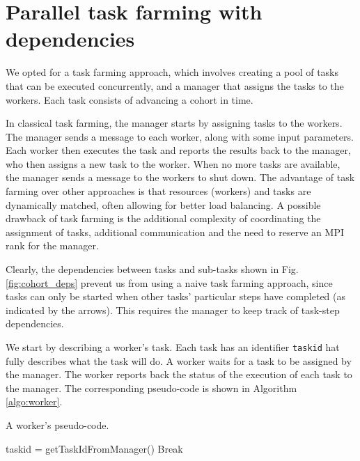 \documentclass[a4paper,oneside,12pt]{article}
\begin{document}
\section{Parallel task farming with dependencies}

We opted for a task farming approach, which involves creating a pool of tasks that can be executed concurrently,
and a manager that assigns the tasks to the workers. Each task consists of advancing a cohort in time.

In classical task farming, the manager starts by assigning tasks to the workers. The manager sends a message to each worker, along with 
some input parameters. Each worker then executes the task and reports the results back to the manager, who then assigns a new task to the worker. 
When no more tasks are available, the manager sends a message to the workers to shut down. The advantage of task farming over other approaches is
that resources (workers) and tasks are dynamically matched, often allowing for better load balancing. A possible drawback of task farming is the 
additional complexity of coordinating the assignment of tasks, additional communication and the need to reserve an MPI rank for the manager.

Clearly, the dependencies between tasks and sub-tasks shown in Fig. \ref{fig:cohort_deps} prevent us from using a naive task farming approach,
since tasks can only be started when other tasks' particular steps have completed
(as indicated by the arrows). This requires the manager to keep track of task-step dependencies.

We start by describing a worker's task. Each task has an identifier \verb|taskid| hat fully describes what the task will do.
A worker waits for a task to be assigned by the manager. 
The worker reports back the status of the execution of each task to the manager. 
The corresponding pseudo-code is shown in Algorithm \ref{algo:worker}.

\begin{algorithm}
\caption{A worker's pseudo-code.}
    \begin{algorithmic}[1] %

        \State taskid = getTaskIdFromManager()
            Break
        \EndIf

        \State {}

        \State {}
    
    \EndWhile
\end{algorithmic}
\label{algo:worker}
\end{algorithm}
\end{document}
